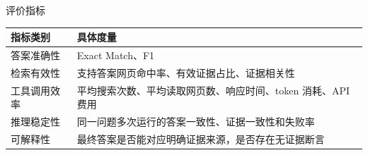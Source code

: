 \documentclass{sintefbeamer}
\newcommand{\tablebody}{\footnotesize\renewcommand{\arraystretch}{1.16}}
\begin{document}
\begin{frame}{评价指标}
  \centering
  \tablebody
  \begin{tabularx}{\textwidth}{B{2.35cm}Y}
    \toprule
    指标类别 & 具体度量 \\
    \midrule
    答案准确性 & Exact Match、F1 \\
    检索有效性 & 支持答案网页命中率、有效证据占比、证据相关性 \\
    工具调用效率 & 平均搜索次数、平均读取网页数、响应时间、token 消耗、API 费用 \\
    推理稳定性 & 同一问题多次运行的答案一致性、证据一致性和失败率 \\
    可解释性 & 最终答案是否能对应明确证据来源，是否存在无证据断言 \\
    \bottomrule
  \end{tabularx}
\end{frame}

\end{document}
